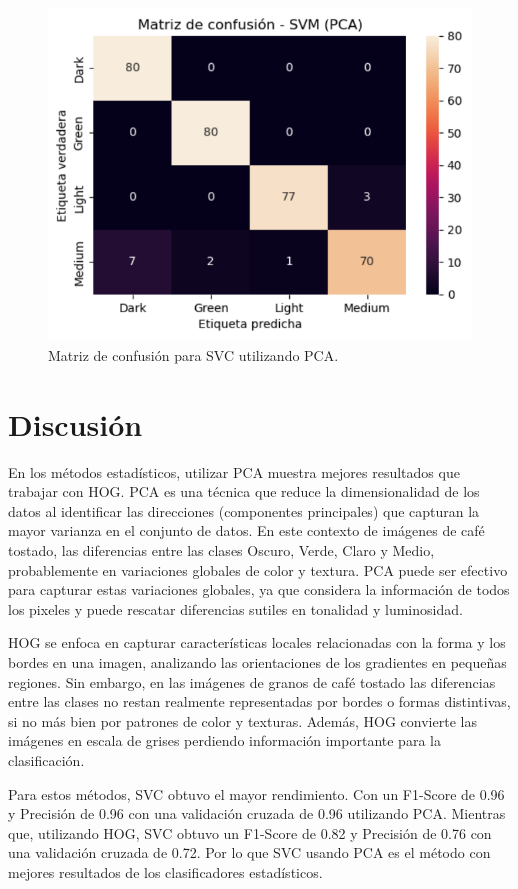 \documentclass[twocolumn]{article}
\begin{document}
\begin{figure}[H] 
  \centering
  \includegraphics[width=0.8\columnwidth]{SVC(PCA).png} 
  \caption{Matriz de confusión para SVC utilizando PCA.}
  \label{fig:PSVC} 
\end{figure}
\vspace{-10pt}

\section{Discusión}

En los métodos estadísticos, utilizar PCA muestra mejores resultados que trabajar con HOG.
PCA es una técnica que reduce la dimensionalidad de los datos al identificar las direcciones (componentes principales) que capturan la mayor varianza en el conjunto de datos. En este contexto de imágenes de café tostado, las diferencias entre las clases Oscuro, Verde, Claro y Medio, probablemente en variaciones globales de color y textura. PCA puede ser efectivo para capturar estas variaciones globales, ya que considera la información de todos los pixeles y puede rescatar diferencias sutiles en tonalidad y luminosidad. 

HOG se enfoca en capturar características locales relacionadas con la forma y los bordes en una imagen, analizando las orientaciones de los gradientes en pequeñas regiones. Sin embargo, en las imágenes de granos de café tostado las diferencias entre las clases no restan realmente representadas por bordes o formas distintivas, si no más bien por patrones de color y texturas. Además, HOG convierte las imágenes en escala de grises perdiendo información importante para la clasificación.

Para estos métodos, SVC obtuvo el mayor rendimiento. Con un F1-Score de 0.96 y Precisión de 0.96 con una validación cruzada de 0.96 utilizando PCA. Mientras que, utilizando HOG, SVC obtuvo un F1-Score de 0.82 y Precisión de 0.76 con una validación cruzada de 0.72. Por lo que SVC usando PCA es el método con mejores resultados de los clasificadores estadísticos.
\end{document}
